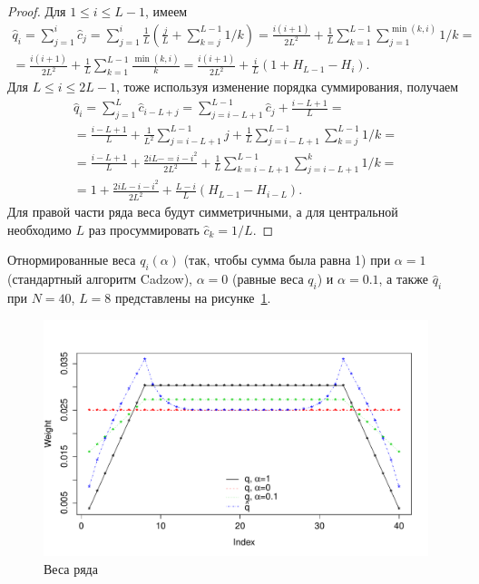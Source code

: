 \documentclass[12pt,a4paper,fleqn,leqno]{article}
\begin{document}
\begin{proof}
Для $1 \le i \le L-1$, имеем
\begin{gather*}
\hat{q}_i = \sum_{j=1}^i \hat{c}_j = \sum_{j=1}^i \frac{1}{L}\left(\frac{j}{L} + \sum_{k=j}^{L-1}1/k\right) =
\frac{i(i+1)}{2L^2}+\frac{1}{L} \sum_{k = 1}^{L-1} \sum_{j=1}^{\min(k,i)} 1/k =\\= \frac{i(i+1)}{2L^2}+\frac{1}{L} \sum_{k = 1}^{L-1} \frac{\min(k,i)}{k} = \frac{i(i+1)}{2 L^2} + \frac{i}{L}(1 + H_{L-1} - H_i).
\end{gather*}
Для $L \le i \le 2L-1$, тоже используя изменение порядка суммирования, получаем
\begin{gather*}
\hat{q}_i = \sum_{j = 1}^L \hat{c}_{i-L+j} = \sum_{j = i - L + 1}^{L - 1} \hat{c}_j + \frac{i - L + 1}{L} =\\
=\frac{i - L + 1}{L} + \frac{1}{L^2} \sum_{j = i - L + 1}^{L-1}j + \frac{1}{L} \sum_{j = i-L + 1}^{L-1} \sum_{k=j}^{L-1}1/k =\\ 
=\frac{i - L + 1}{L} + \frac{2iL - =i - i^2}{2L^2} + \frac{1}{L} \sum_{k = i - L + 1}^{L - 1} \sum_{j = i - L + 1}^k 1/k =\\
=1 + \frac{2iL-i-i^2}{2L^2} + \frac{L-i}{L}(H_{L-1} - H_{i - L}).
\end{gather*}
Для правой части ряда веса будут симметричными, а для центральной необходимо $L$ раз просуммировать $\hat{c}_k = 1/L$.
\end{proof}

Отнормированные веса $q_i(\alpha)$ (так, чтобы сумма была равна 1) при $\alpha = 1$ (стандартный алгоритм Cadzow), $\alpha = 0$ (равные веса $q_i$) и $\alpha = 0.1$,
 а также $\hat{q}_i$ при $N = 40$, $L = 8$ представлены на рисунке~\ref{img_weights}.
\begin{figure}[!h] \begin{center}
\includegraphics[width = 15cm]{weights.pdf}\caption{Веса ряда}\label{img_weights}
\end{center}\end{figure}
\end{document}
